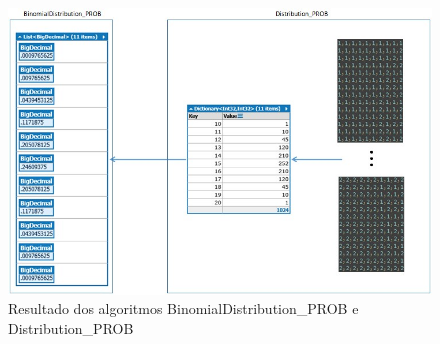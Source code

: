 \begin{apendicesenv}
	\begin{figure}[H]
	\caption{Resultado dos algoritmos  BinomialDistribution\_PROB e Distribution\_PROB}
	\label{fig:BinomialDistribution_PROB_and_Distribution_PROB}
	\centering
	\includegraphics[scale=.77]{sections/images/BinomialDistribution_PROB_and_Distribution_PROB.jpg}
	\end{figure}


\end{apendicesenv}
